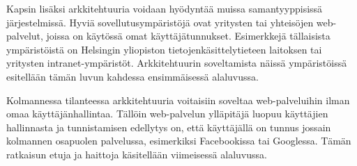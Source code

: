 Kapsin lisäksi arkkitehtuuria voidaan hyödyntää muissa samantyyppisissä järjestelmissä. Hyviä sovellutusympäristöjä ovat yritysten tai yhteisöjen web-palvelut, joissa on käytössä omat käyttäjätunnukset. Esimerkkejä tällaisista ympäristöistä on Helsingin yliopiston tietojenkäsittelytieteen laitoksen tai yritysten intranet-ympäristöt. Arkkitehtuurin soveltamista näissä ympäristöissä esitellään tämän luvun kahdessa ensimmäisessä alaluvussa.

Kolmannessa tilanteessa arkkitehtuuria voitaisiin soveltaa web-palveluihin ilman omaa käyttäjänhallintaa. Tällöin web-palvelun ylläpitäjä luopuu käyttäjien hallinnasta ja tunnistamisen edellytys on, että käyttäjällä on tunnus jossain kolmannen osapuolen palvelussa, esimerkiksi Facebookissa tai Googlessa. Tämän ratkaisun etuja ja haittoja käsitellään viimeisessä alaluvussa.